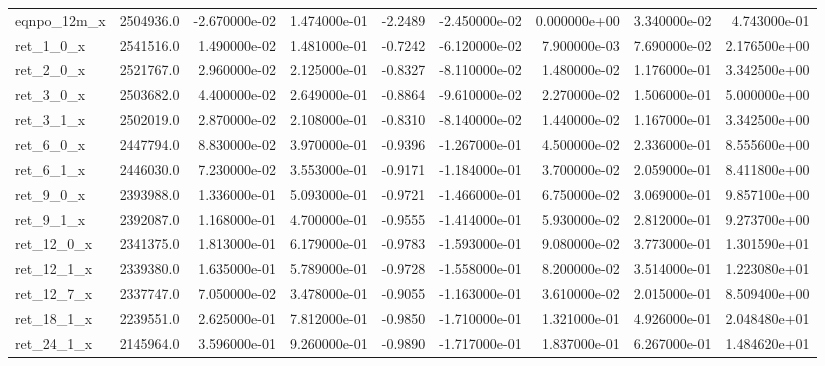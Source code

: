 \documentclass[10pt]{article}
\begin{document}
\begin{landscape}
\begin{longtable}{|l|r|r|r|r|r|r|r|r|}
eqnpo\_12m\_x             &  2504936.0 & -2.670000e-02 &  1.474000e-01 &     -2.2489 & -2.450000e-02 &  0.000000e+00 &  3.340000e-02 &  4.743000e-01 \\
ret\_1\_0\_x               &  2541516.0 &  1.490000e-02 &  1.481000e-01 &     -0.7242 & -6.120000e-02 &  7.900000e-03 &  7.690000e-02 &  2.176500e+00 \\
ret\_2\_0\_x               &  2521767.0 &  2.960000e-02 &  2.125000e-01 &     -0.8327 & -8.110000e-02 &  1.480000e-02 &  1.176000e-01 &  3.342500e+00 \\
ret\_3\_0\_x               &  2503682.0 &  4.400000e-02 &  2.649000e-01 &     -0.8864 & -9.610000e-02 &  2.270000e-02 &  1.506000e-01 &  5.000000e+00 \\
ret\_3\_1\_x               &  2502019.0 &  2.870000e-02 &  2.108000e-01 &     -0.8310 & -8.140000e-02 &  1.440000e-02 &  1.167000e-01 &  3.342500e+00 \\
ret\_6\_0\_x               &  2447794.0 &  8.830000e-02 &  3.970000e-01 &     -0.9396 & -1.267000e-01 &  4.500000e-02 &  2.336000e-01 &  8.555600e+00 \\
ret\_6\_1\_x               &  2446030.0 &  7.230000e-02 &  3.553000e-01 &     -0.9171 & -1.184000e-01 &  3.700000e-02 &  2.059000e-01 &  8.411800e+00 \\
ret\_9\_0\_x               &  2393988.0 &  1.336000e-01 &  5.093000e-01 &     -0.9721 & -1.466000e-01 &  6.750000e-02 &  3.069000e-01 &  9.857100e+00 \\
ret\_9\_1\_x               &  2392087.0 &  1.168000e-01 &  4.700000e-01 &     -0.9555 & -1.414000e-01 &  5.930000e-02 &  2.812000e-01 &  9.273700e+00 \\
ret\_12\_0\_x              &  2341375.0 &  1.813000e-01 &  6.179000e-01 &     -0.9783 & -1.593000e-01 &  9.080000e-02 &  3.773000e-01 &  1.301590e+01 \\
ret\_12\_1\_x              &  2339380.0 &  1.635000e-01 &  5.789000e-01 &     -0.9728 & -1.558000e-01 &  8.200000e-02 &  3.514000e-01 &  1.223080e+01 \\
ret\_12\_7\_x              &  2337747.0 &  7.050000e-02 &  3.478000e-01 &     -0.9055 & -1.163000e-01 &  3.610000e-02 &  2.015000e-01 &  8.509400e+00 \\
ret\_18\_1\_x              &  2239551.0 &  2.625000e-01 &  7.812000e-01 &     -0.9850 & -1.710000e-01 &  1.321000e-01 &  4.926000e-01 &  2.048480e+01 \\
ret\_24\_1\_x              &  2145964.0 &  3.596000e-01 &  9.260000e-01 &     -0.9890 & -1.717000e-01 &  1.837000e-01 &  6.267000e-01 &  1.484620e+01 \\

\end{longtable}
\end{landscape}
\end{document}
